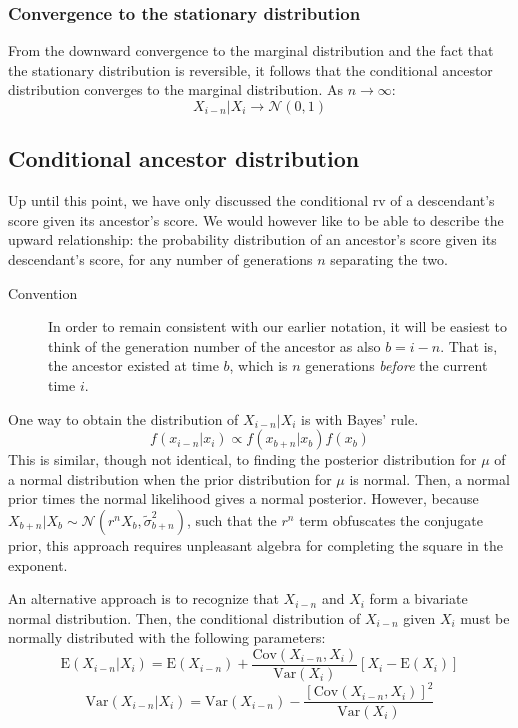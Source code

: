 \documentclass[a4paper,11pt]{article} %
\begin{document}
\subsubsection*{Convergence to the stationary distribution}

From the downward convergence to the marginal distribution and the fact that the stationary distribution is reversible, it follows that the conditional ancestor distribution converges to the marginal distribution. 
As $n \rightarrow \infty$:
$$X_{i-n}|X_i \rightarrow \mathcal{N}(0, 1)$$



\subsection{Conditional ancestor distribution}

Up until this point, we have only discussed the conditional rv of a descendant's score given its ancestor's score. We would however like to be able to describe the upward relationship: the probability distribution of an ancestor's score given its descendant's score, for any number of generations $n$ separating the two. 

\begin{description}
\item [Convention] In order to remain consistent with our earlier notation, it will be easiest to think of the generation number of the ancestor as also $b = i - n$. That is, the ancestor existed at time $b$, which is $n$ generations \emph{before} the current time $i$. 
\end{description}

One way to obtain the distribution of $X_{i-n}|X_i$ is with Bayes' rule. 
$$f(x_{i-n}|x_i) \propto f(x_{b+n}|x_b) f(x_b)$$
This is similar, though not identical, to finding the posterior distribution for $\mu$ of a normal distribution when the prior distribution for $\mu$ is normal. Then, a normal prior times the normal likelihood gives a normal posterior. However, because $X_{b+n}|X_b \sim \mathcal{N}(r^n X_b, \tilde{\sigma}_{b+n}^2)$, such that the $r^n$ term obfuscates the conjugate prior, this approach requires unpleasant algebra for completing the square in the exponent. 

An alternative approach is to recognize that $X_{i-n}$ and $X_i$ form a bivariate normal distribution. Then, the conditional distribution of $X_{i-n}$ given $X_i$ must be normally distributed with the following parameters:
$$\mathrm{E}(X_{i-n}|X_i) = \mathrm{E}(X_{i-n}) + \frac{\mathrm{Cov}(X_{i-n}, X_i)}{\mathrm{Var}(X_i)}[X_i - \mathrm{E}(X_i)]$$
$$\mathrm{Var}(X_{i-n}|X_i) = \mathrm{Var}(X_{i-n}) - \frac{[\mathrm{Cov}(X_{i-n}, X_i)]^2}{\mathrm{Var}(X_i)}$$
\end{document}
